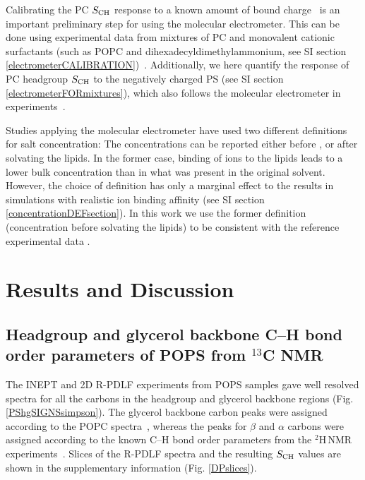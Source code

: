 \documentclass[journal=jpcbfk,manuscript=article]{achemso}
\begin{document}
Calibrating the PC $S_{\rm CH}$ response to a known amount of bound charge~\cite{catte16,melcr18} is an important preliminary step for using the molecular electrometer.
This can be done using experimental data from mixtures of PC and
monovalent cationic surfactants (such as POPC and dihexadecyldimethylammonium,
see SI section \ref{electrometerCALIBRATION})~\cite{scherer89,melcr18}.
Additionally, we here quantify the response of PC headgroup $S_{\rm CH}$
to the negatively charged PS (see SI section \ref{electrometerFORmixtures}), which also follows the molecular electrometer
in experiments~\cite{scherer87}.

Studies applying the molecular electrometer have used two different definitions for salt concentration:
The concentrations can be reported either before \cite{akutsu81,roux90,catte16}, or after \cite{altenbach84,melcr18} solvating the lipids.
In the former case, binding of ions to the lipids leads to a lower bulk concentration than in what was present in the original solvent.
However, the choice of definition has only a marginal effect
to the results in simulations with realistic ion binding affinity
(see SI section \ref{concentrationDEFsection}).
In this work we use the former definition (concentration before solvating the lipids) to be consistent with the reference
experimental data \cite{roux90}.

\section{Results and Discussion}

\subsection{Headgroup and glycerol backbone C--H bond order parameters of POPS from $^{13}$C NMR}
The INEPT and 2D R-PDLF experiments from POPS samples gave well resolved spectra for all the
carbons in the headgroup and glycerol backbone regions (Fig. \ref{PShgSIGNSsimpson}).
The glycerol backbone carbon peaks were assigned according to the POPC spectra~\cite{ferreira13}, whereas
the peaks for $\beta$ and $\alpha$ carbons were assigned according to the
known C--H bond order parameters from the $^2$H\,NMR experiments~\cite{browning80}.
Slices of the R-PDLF spectra and the resulting  $S_{\rm CH}$ values
are shown in the supplementary information (Fig. \ref{DPslices}). 
\end{document}
